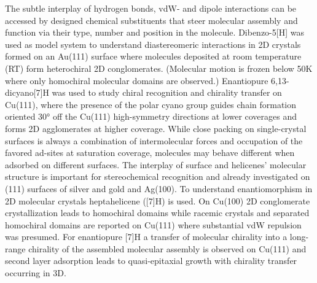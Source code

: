 The subtle interplay of hydrogen bonds, vdW- and dipole interactions can be accessed by designed chemical substituents that steer molecular assembly and function via their type, number and position in the molecule. Dibenzo-5[H] was used as model system to understand diastereomeric interactions in 2D crystals formed on an Au(111) surface where molecules deposited at room temperature (RT) form heterochiral 2D conglomerates.\cite{Seibel_Chiral_2013} (Molecular motion is frozen below 50K where only homochiral molecular domains are observed.) Enantiopure 6,13-dicyano[7]H was used to study chiral recognition and chirality transfer on Cu(111)\cite{Shchyrba_Chirality_2013, Stoehr_Self-assembly_2011}, where the presence of the polar cyano group guides chain formation oriented 30° off the Cu(111) high-symmetry directions at lower coverages and forms 2D agglomerates at higher coverage. While close packing on single-crystal surfaces is always a combination of intermolecular forces and occupation of the favored ad-sites at saturation coverage, molecules may behave different when adsorbed on different surfaces. The interplay of surface and helicenes’ molecular structure is important for stereochemical recognition\cite{Ernst_Stereochemical_2016} and already investigated on (111) surfaces of silver and gold\cite{Seibel_Two-dimensional_2014} and Ag(100)\cite{Seibel_Homochiral_2015}. To understand enantiomorphism in 2D molecular crystals heptahelicene ([7]H) is used.\cite{Parschau_coverage_2008, Fasel_Amplification_2006} On Cu(100) 2D conglomerate crystallization leads to homochiral domains\cite{Seibel_conglomerate_2014} while racemic crystals\cite{Fasel_Amplification_2006} and separated homochiral domains\cite{Ernst_two-dimensional_2001} are reported on Cu(111) where substantial vdW repulsion was presumed. For enantiopure [7]H a transfer of molecular chirality into a long-range chirality of the assembled molecular assembly is observed on Cu(111)\cite{Fasel_Chirality_2003} and second layer adsorption leads to quasi-epitaxial growth with chirality transfer occurring in 3D.\cite{Parschau_Chirality_2010}

